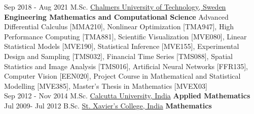 \documentclass[letterpaper]{templatecv} %
\begin{document}
\begin{twenty} 
	\twentyitem
    	{Sep 2018 -}
        {Aug 2021}
        {M.Sc.}
        {\href{https://www.chalmers.se/en/Pages/default.aspx}{Chalmers University of Technology, Sweden}}
        {\textbf{Engineering Mathematics and Computational Science}}
        {Advanced Differential Calculus [MMA210], Nonlinear Optimization [TMA947], High Performance Computing [TMA881], Scientific Visualization [MVE080], Linear Statistical Models  [MVE190], Statistical Inference [MVE155], %
        Experimental Design and Sampling [TMS032], Financial Time Series [TMS088], 
        Spatial Statistics and Image Analysis [TMS016], %
        Artificial Neural Networks [FFR135], %
        Computer Vision [EEN020], Project Course in Mathematical and Statistical Modelling [MVE385], Master's Thesis in Mathematics [MVEX03]}\\
	\twentyitem
    	{Sep 2012 -}
		{Nov 2014}
        {M.Sc.}
        {\href{https://www.caluniv.ac.in/}{Calcutta University, India}}
        {\textbf{Applied Mathematics}}
        {%
        }\\
        \twentyitem
    	{Jul 2009-}
		{Jul 2012}
        {B.Sc.}
         {\href{https://www.sxccal.edu/}{St. Xavier's College, India}}
 {\textbf{Mathematics}}
        {%
        }

\end{twenty}
\end{document}
